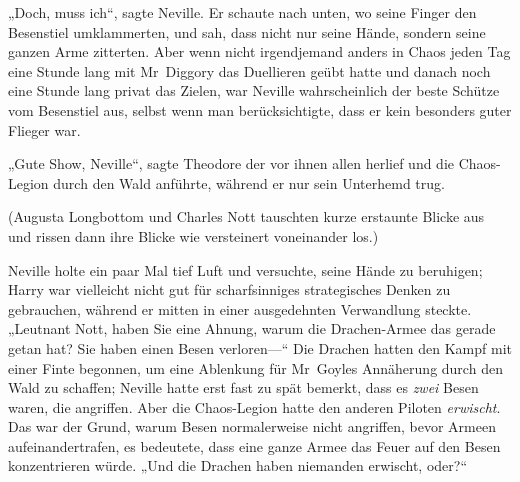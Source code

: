 „Doch, muss ich“, sagte Neville. Er schaute nach unten, wo seine Finger den Besenstiel umklammerten, und sah, dass nicht nur seine Hände, sondern seine ganzen Arme zitterten. Aber wenn nicht irgendjemand anders in Chaos jeden Tag eine Stunde lang mit Mr~Diggory das Duellieren geübt hatte und danach noch eine Stunde lang privat das Zielen, war Neville wahrscheinlich der beste Schütze vom Besenstiel aus, selbst wenn man berücksichtigte, dass er kein besonders guter Flieger war.

„Gute Show, Neville“, sagte Theodore der vor ihnen allen herlief und die Chaos-Legion durch den Wald anführte, während er nur sein Unterhemd trug.

(Augusta Longbottom und Charles Nott tauschten kurze erstaunte Blicke aus und rissen dann ihre Blicke wie versteinert voneinander los.)

Neville holte ein paar Mal tief Luft und versuchte, seine Hände zu beruhigen; Harry war vielleicht nicht gut für scharfsinniges strategisches Denken zu gebrauchen, während er mitten in einer ausgedehnten Verwandlung steckte. „Leutnant Nott, haben Sie eine Ahnung, warum die Drachen-Armee das gerade getan hat? Sie haben einen Besen verloren—“ Die Drachen hatten den Kampf mit einer Finte begonnen, um eine Ablenkung für Mr~Goyles Annäherung durch den Wald zu schaffen; Neville hatte erst fast zu spät bemerkt, dass es \emph{zwei} Besen waren, die angriffen. Aber die Chaos-Legion hatte den anderen Piloten \emph{erwischt}. Das war der Grund, warum Besen normalerweise nicht angriffen, bevor Armeen aufeinandertrafen, es bedeutete, dass eine ganze Armee das Feuer auf den Besen konzentrieren würde. „Und die Drachen haben niemanden erwischt, oder?“

